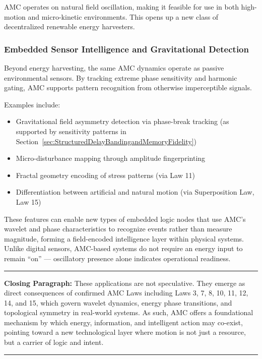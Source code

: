 \documentclass[10pt,aps,pre,onecolumn,superscriptaddress,notitlepage]{revtex4-2}
\begin{document}
AMC operates on natural field oscillation, making it feasible for use in both high-motion and micro-kinetic environments. This opens up a new class of decentralized renewable energy harvesters.

\subsubsection{Embedded Sensor Intelligence and Gravitational Detection}
Beyond energy harvesting, the same AMC dynamics operate as passive environmental sensors. By tracking extreme phase sensitivity and harmonic gating, AMC supports pattern recognition from otherwise imperceptible signals.

Examples include:

\begin{itemize}
    \item Gravitational field asymmetry detection via phase-break tracking (as supported by sensitivity patterns in Section~\ref{sec:StructuredDelayBandingandMemoryFidelity})
   \item Micro-disturbance mapping through amplitude fingerprinting
   \item Fractal geometry encoding of stress patterns (via Law 11)
   \item Differentiation between artificial and natural motion (via Superposition Law, Law 15)
\end{itemize}

These features can enable new types of embedded logic nodes that use AMC’s wavelet and phase characteristics to recognize events rather than measure magnitude, forming a field-encoded intelligence layer within physical systems. Unlike digital sensors, AMC-based systems do not require an energy input to remain “on” — oscillatory presence alone indicates operational readiness. 

\vspace{1em}
\hrule
\vspace{1em}
\textbf{Closing Paragraph:} These applications are not speculative. They emerge as direct consequences of confirmed AMC Laws  including Laws 3, 7, 8, 10, 11, 12, 14, and 15, which govern wavelet dynamics, energy phase transitions, and topological symmetry in real-world systems. As such, AMC offers a foundational mechanism by which energy, information, and intelligent action may co-exist, pointing toward a new technological layer where motion is not just a resource, but a carrier of logic and intent. 
\vspace{1em}
\hrule
\vspace{1em}
\end{document}
